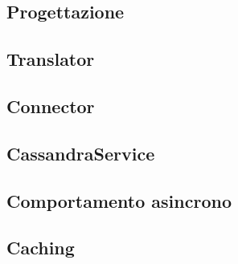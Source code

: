 		
	\subsection{Progettazione}
	
		
	\subsection{Translator}
	
		
	\subsection{Connector}
	
	
	\subsection{CassandraService}
	
		
	\subsection{Comportamento asincrono}
	
			
	\subsection{Caching}
	
